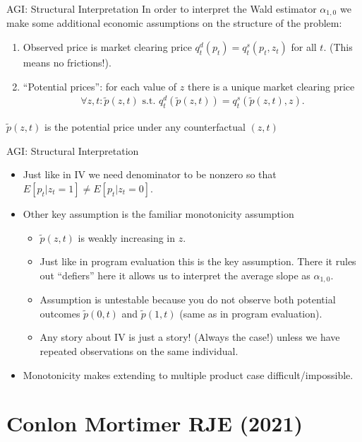 \documentclass[xcolor=pdftex,dvipsnames,table,mathserif,aspectratio=169]{beamer}
\begin{document}
\begin{frame}{AGI: Structural Interpretation}
In order to interpret the Wald estimator $\alpha_{1,0}$ we make some additional \alert{economic} assumptions on the structure of the problem:
\begin{enumerate}
\item Observed price is market clearing price $q_t^d(p_t) = q_t^s(p_t,z_t)$ for all $t$. (This means no frictions!).
\item ``Potential prices'': for each value of $z$ there is a unique market clearing price
\begin{eqnarray*}
\forall z,t : \tilde{p}(z,t) \mbox{ s.t. } q_t^d(\tilde{p}(z,t)) = q_t^s(\tilde{p}(z,t),z).
\end{eqnarray*}
\end{enumerate}
$\tilde{p}(z,t)$ is the potential price under any counterfactual $(z,t)$
\end{frame}


\begin{frame}{AGI: Structural Interpretation}
\begin{itemize}
\item Just like in IV we need denominator to be nonzero so that
$E[p_t | z_t=1] \neq E[p_t | z_t = 0]$.
\item Other key assumption is the familiar \alert{monotonicity} assumption
\begin{itemize}
\item $\tilde{p}(z,t)$ is weakly increasing in $z$.
\item Just like in program evaluation this is the key assumption. There it rules out ``defiers'' here it allows us to interpret the \alert{average slope} as $\alpha_{1,0}$.
\item Assumption is untestable because you do not observe both potential outcomes $\tilde{p}(0,t)$ and $\tilde{p}(1,t)$ (same as in program evaluation).
\item Any story about IV is just a story! (Always the case!) unless we have repeated observations on the same individual.
\end{itemize}
\item Monotonicity makes extending to multiple product case difficult/impossible.
\end{itemize}
\end{frame}


\section{Conlon Mortimer RJE (2021)}
\end{document}
